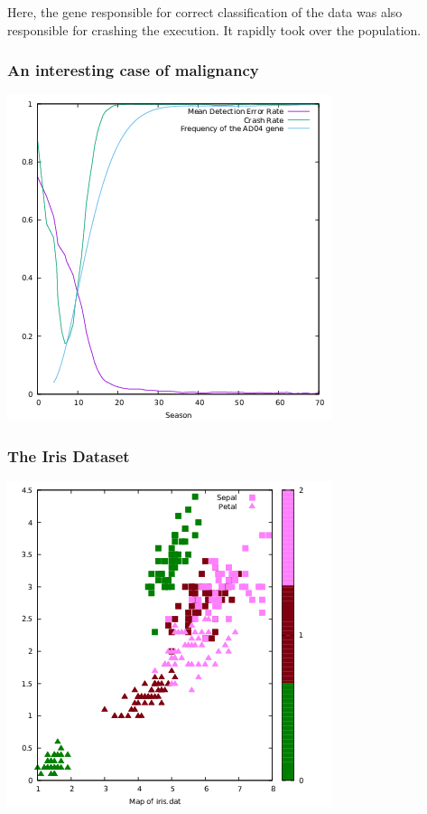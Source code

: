 \documentclass[11pt]{article}
\begin{document}
Here, the gene responsible for correct classification of the data was also responsible for crashing the execution. It rapidly took over the population.

\subsubsection*{An interesting case of malignancy}
\label{sec:orgf16cc07}
\begin{center}
\includegraphics[width=.9\linewidth]{./img/fizwej-badgenes.png}
\end{center}

\subsubsection*{The Iris Dataset}
\label{sec:org85dea46}
\begin{center}
\includegraphics[width=.9\linewidth]{./img/iris_plot.png}
\end{center}
\end{document}
